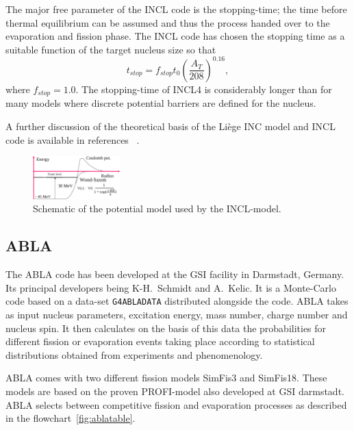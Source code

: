 The major free parameter of the INCL code is the stopping-time; the time before thermal equilibrium can be assumed and thus the process handed over to the evaporation and fission phase. The INCL code has chosen the stopping time as a suitable function of the target nucleus size so that $$t_{stop} = f_{stop}t_{0}(\frac{A_T}{208})^{0.16},$$ where $f_{stop} = 1.0$. The stopping-time of INCL4 is considerably longer than for many models where discrete potential barriers are defined for the nucleus.

A further discussion of the theoretical basis of the Liège INC model and INCL code is available in references ~\cite{PhysRevC.66.044615,iia}.

\begin{figure}[ht]
\begin{center}
\includegraphics[width=0.3\textwidth]{images/inclPotential.png}  
\caption{\label{fig:inclpotential} Schematic of the potential model used by the INCL-model.}
 
 \end{center}
 \end{figure}


\subsection{ABLA}

The ABLA code has been developed at the GSI facility in Darmstadt, Germany. Its principal developers being K-H.~Schmidt and A.~Kelic. It is a Monte-Carlo code based on a data-set {\tt G4ABLADATA} distributed alongside the code. ABLA takes as input nucleus parameters, excitation energy, mass number, charge number and nucleus spin. It then calculates on the basis of this data the probabilities for different fission or evaporation events taking place according to statistical distributions obtained from experiments and phenomenology.

ABLA comes with two different fission models SimFis3 and SimFis18. These models are based on the proven PROFI-model also developed at GSI darmstadt. ABLA selects between competitive fission and evaporation processes as described in the flowchart~\ref{fig:ablatable}.

